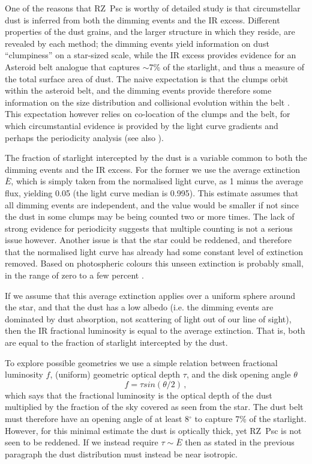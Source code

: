 \documentclass[]{rsos}
\begin{document}
One of the reasons that RZ~Psc is worthy of detailed study is that circumstellar dust is
inferred from both the dimming events and the IR excess. Different properties of the dust
grains, and the larger structure in which they reside, are revealed by each method; the
dimming events yield information on dust ``clumpiness'' on a star-sized scale, while the
IR excess provides evidence for an Asteroid belt analogue that captures $\sim$7\% of the
starlight, and thus a measure of the total surface area of dust. The naive expectation is
that the clumps orbit within the asteroid belt, and the dimming events provide therefore
some information on the size distribution and collisional evolution within the belt
\cite{2013A&A...553L...1D}. This expectation however relies on co-location of the clumps
and the belt, for which circumstantial evidence is provided by the light curve gradients
and perhaps the periodicity analysis (see also \cite{2010A&A...524A...8G}).

The fraction of starlight intercepted by the dust is a variable common to both the
dimming events and the IR excess. For the former we use the average extinction $\bar{E}$,
which is simply taken from the normalised light curve, as 1 minus the average flux,
yielding 0.05 (the light curve median is 0.995). This estimate assumes that all dimming
events are independent, and the value would be smaller if not since the dust in some
clumps may be being counted two or more times. The lack of strong evidence for
periodicity suggests that multiple counting is not a serious issue however. Another issue
is that the star could be reddened, and therefore that the normalised light curve has
already had some constant level of extinction removed. Based on photospheric colours this
unseen extinction is probably small, in the range of zero to a few percent
\cite{2000ARep...44..611K}.

If we assume that this average extinction applies over a uniform sphere around the star,
and that the dust has a low albedo (i.e. the dimming events are dominated by dust
absorption, not scattering of light out of our line of sight), then the IR fractional
luminosity is equal to the average extinction. That is, both are equal to the fraction of
starlight intercepted by the dust.

To explore possible geometries we use a simple relation between fractional luminosity
$f$, (uniform) geometric optical depth $\tau$, and the disk opening angle $\theta$
\cite{2014MNRAS.438.3299K}
\begin{equation}
  f = \tau sin(\theta/2) \, ,
\end{equation}
which says that the fractional luminosity is the optical depth of the dust multiplied by
the fraction of the sky covered as seen from the star. The dust belt must therefore have
an opening angle of at least 8$^\circ$ to capture 7\% of the starlight. However, for this
minimal estimate the dust is optically thick, yet RZ~Psc is not seen to be reddened. If
we instead require $\tau \sim \bar{E}$ then as stated in the previous paragraph the dust
distribution must instead be near isotropic.
\end{document}
